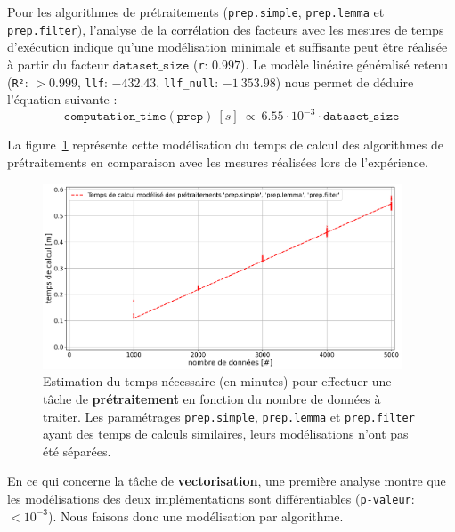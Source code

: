 			Pour les algorithmes de prétraitements (\texttt{prep.simple}, \texttt{prep.lemma} et \texttt{prep.filter}), l'analyse de la corrélation des facteurs avec les mesures de temps d'exécution indique qu'une modélisation minimale et suffisante peut être réalisée à partir du facteur $\texttt{dataset\_size}$ (\texttt{r}: $0.997$).
			Le modèle linéaire généralisé retenu (\texttt{R²}: $> 0.999$, \texttt{llf}: $-432.43$, \texttt{llf\_null}: $-1~353.98$) nous permet de déduire l'équation suivante :
			\begin{equation}
				\texttt{computation\_time}(\texttt{prep})~[s]~
				\propto~6.55 \cdot 10^{-3} \cdot \texttt{dataset\_size}
			\end{equation}
			
			La figure~\ref{figure:4.3.2-ETUDE-COUTS-TEMPS-CALCUL-MODELISATION-PREPROCESSING} représente cette modélisation du temps de calcul des algorithmes de prétraitements en comparaison avec les mesures réalisées lors de l'expérience.
			\newline
			\begin{figure}[!htb]
				\centering
				\includegraphics[width=0.95\textwidth]{figures/etude-temps-calcul-modelisation-1prep}
				\caption{Estimation du temps nécessaire (en minutes) pour effectuer une tâche de \textbf{prétraitement} en fonction du nombre de données à traiter. Les paramétrages \texttt{prep.simple}, \texttt{prep.lemma} et \texttt{prep.filter} ayant des temps de calculs similaires, leurs modélisations n'ont pas été séparées.}
				\label{figure:4.3.2-ETUDE-COUTS-TEMPS-CALCUL-MODELISATION-PREPROCESSING}
			\end{figure}
			
			
			En ce qui concerne la tâche de \textbf{vectorisation}, une première analyse montre que les modélisations des deux implémentations sont différentiables (\texttt{p-valeur}: $< 10^{-3}$). Nous faisons donc une modélisation par algorithme.
		
